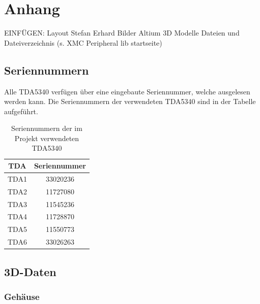 \chapter{Anhang}
\label{sec:Anhang}
\pagestyle{scrheadings}
EINFÜGEN:
Layout Stefan Erhard
Bilder Altium
3D Modelle
Dateien und Dateiverzeichnis (s. XMC Peripheral lib startseite)

\section{Seriennummern}
\label{app:Seriennummern}
Alle TDA5340 verfügen über eine eingebaute Seriennummer, welche ausgelesen werden kann. Die Seriennummern der verwendeten TDA5340 sind in der Tabelle aufgeführt.
\begin{table}[h]
\centering
\begin{tabular}{cc}
TDA & Seriennummer\\
\hline
TDA1 & 33020236\\
TDA2 & 11727080\\
TDA3& 11545236\\
TDA4& 11728870\\
TDA5& 11550773\\
TDA6& 33026263\\
\end{tabular}
\caption{Seriennummern der im Projekt verwendeten TDA5340 }
\label{default}
\end{table}

\section{3D-Daten}
\subsection{Gehäuse}
\label{app:Gehäuse}



